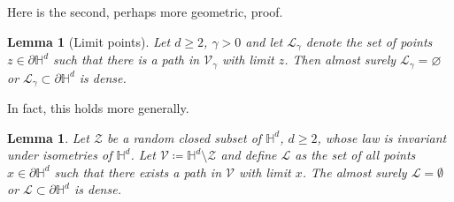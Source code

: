 \documentclass[12pt,a4paper]{article}
\newtheorem{lemma}[proposition]{Lemma}
\theoremstyle{definition}
\renewcommand{\H}{\mathbb{H}}
\begin{document}
Here is the second, perhaps more geometric, proof.

\begin{lemma}[Limit points] \label{lm:limitpoins} Let $d\ge2$, $\gamma>0$ and let $\mathcal L_\gamma$ denote the set of points $z\in\partial \mathbb H^d$ such that there is a path in $\mathcal V_\gamma$ with limit $z$. Then almost surely $\mathcal L_\gamma=\varnothing$ or $\mathcal L_\gamma \subset\partial \mathbb H^d$ is dense.
\end{lemma}

In fact, this holds more generally. 

\begin{lemma}
Let \(\mathcal{Z}\) be a random closed subset of \(\H^d\), \(d \geq 2\), whose law is invariant under isometries of \(\H^d\).
Let \(\mathcal{V} \coloneqq \H^d \setminus \mathcal{Z}\) and define \(\mathcal{L}\) as the set of all points \(x \in \partial\H^d\) such that there exists a path in \(\mathcal{V}\) with limit \(x\).
The almost surely \(\mathcal{L} = \emptyset\) or \(\mathcal{L}\subset\partial \mathbb H^d\) is dense.
\end{lemma}
\end{document}
